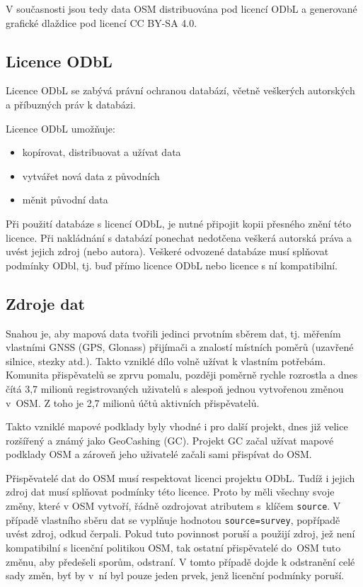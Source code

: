V současnosti jsou tedy data OSM distribuována pod licencí ODbL a
generované grafické dlaždice pod licencí CC BY-SA 4.0. \cite{OSMlicence}

\subsection{Licence ODbL}
Licence ODbL
se zabývá právní ochranou databází, včetně
veškerých autorských a příbuzných práv k databázi.

Licence ODbL umožňuje:
\begin{itemize}
    \item    kopírovat, distribuovat a užívat data
    \item    vytvářet nová data z původních
    \item    měnit původní data
\end{itemize}

Při použití databáze s licencí ODbL, je
nutné připojit kopii přesného znění této licence.
Při nakládnání s databází ponechat nedotčena veškerá autorská práva a
uvést jejich zdroj (nebo autora).
Veškeré odvozené databáze musí splňovat podmínky ODbl,
tj. buď přímo licence ODbL nebo licence s ní kompatibilní. \cite{ODbLv1}


\subsection{Zdroje dat}
\label{Zdroje dat}
Snahou je, aby mapová data tvořili jedinci prvotním
sběrem dat, tj. měřením vlastními GNSS (GPS, Glonass) přijímači a
znalostí místních poměrů (uzavřené silnice, stezky atd.).  Takto
vzniklé dílo volně užívat k vlastním potřebám. Komunita přispěvatelů se
zprvu pomalu, později poměrně rychle rozrostla a dnes čítá 3,7 milionů
registrovaných uživatelů s alespoň jednou vytvořenou změnou v~OSM. Z toho je 2,7 milionů účtů aktivních přispěvatelů.\cite{OSMstats}

Takto vzniklé mapové podklady byly vhodné i pro další projekt, dnes již
velice rozšířený a známý jako GeoCashing (GC). Projekt GC začal užívat mapové
podklady OSM a zároveň jeho uživatelé začali sami přispívat do OSM. 

Přispěvatelé dat do OSM musí respektovat licenci projektu ODbL.
Tudíž i jejich zdroj dat musí splňovat podmínky této licence.
Proto by měli
všechny svoje změny, které v OSM vytvoří, řádně ozdrojovat atributem
s~klíčem 
{\tt source}.
V případě vlastního sběru dat se vyplňuje hodnotou
{\tt source=survey},
popřípadě uvést zdroj, odkud čerpali. Pokud tuto povinnost poruší a
použijí zdroj, jež není kompatibilní s licenční politikou OSM, tak ostatní 
přispěvatelé do~OSM tuto změnu, aby předešeli sporům, odstraní. 
V tomto případě dojde k odstranění celé sady změn, byť by v~ní byl pouze jeden prvek, jenž licenční podmínky poruší.

